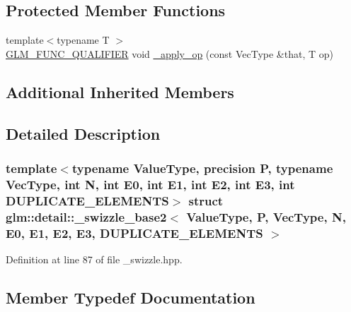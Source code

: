 \subsection*{Protected Member Functions}
\begin{DoxyCompactItemize}
\item 
{\footnotesize template$<$typename T $>$ }\\\hyperlink{setup_8hpp_a33fdea6f91c5f834105f7415e2a64407}{G\+L\+M\+\_\+\+F\+U\+N\+C\+\_\+\+Q\+U\+A\+L\+I\+F\+I\+ER} void \hyperlink{structglm_1_1detail_1_1__swizzle__base2_a11d049274a60ecf4aac8cebc4c4e9be5}{\+\_\+apply\+\_\+op} (const Vec\+Type \&that, T op)
\end{DoxyCompactItemize}
\subsection*{Additional Inherited Members}


\subsection{Detailed Description}
\subsubsection*{template$<$typename Value\+Type, precision P, typename Vec\+Type, int N, int E0, int E1, int E2, int E3, int D\+U\+P\+L\+I\+C\+A\+T\+E\+\_\+\+E\+L\+E\+M\+E\+N\+TS$>$\newline
struct glm\+::detail\+::\+\_\+swizzle\+\_\+base2$<$ Value\+Type, P, Vec\+Type, N, E0, E1, E2, E3, D\+U\+P\+L\+I\+C\+A\+T\+E\+\_\+\+E\+L\+E\+M\+E\+N\+T\+S $>$}



Definition at line 87 of file \+\_\+swizzle.\+hpp.



\subsection{Member Typedef Documentation}
\mbox{\label{structglm_1_1detail_1_1__swizzle__base2_a656c11aaeeaca042deed88711c9dc063}} 
